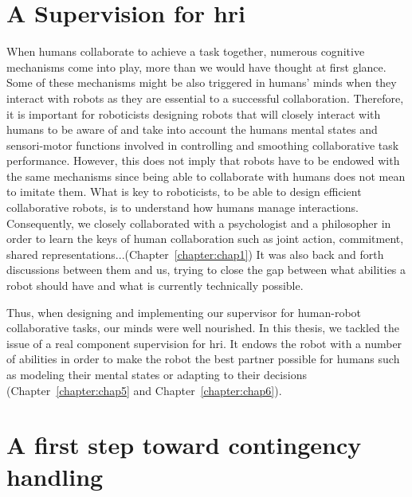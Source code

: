 \documentclass[a4paper,11pt,twoside]{StyleThese}
\begin{document}
\section*{A Supervision for \acrlong{hri}}
When humans collaborate to achieve a task together, numerous cognitive mechanisms come into play, more than we would have thought at first glance. Some of these mechanisms might be also triggered in humans’ minds when they interact with robots as they are essential to a successful collaboration. Therefore, it is important for roboticists designing robots that will closely interact with humans to be aware of and take into account the humans mental states and sensori-motor functions involved in controlling and smoothing collaborative task performance. However, this does not imply that robots have to be endowed with the same mechanisms since being able to collaborate with humans does not mean to imitate them. What is key to roboticists, to be able to design efficient collaborative robots, is to understand how humans manage interactions. Consequently, we closely collaborated with a psychologist and a philosopher in order to learn the keys of human collaboration such as joint action, commitment, shared representations...(Chapter~\ref{chapter:chap1}) It was also back and forth discussions between them and us, trying to close the gap between what abilities a robot should have and what is currently technically possible.

Thus, when designing and implementing our supervisor for human-robot collaborative tasks, our minds were well nourished. In this thesis, we tackled the issue of a real component supervision for \acrshort{hri}. It endows the robot with a number of abilities in order to make the robot the best partner possible for humans such as modeling their mental states or adapting to their decisions (Chapter~\ref{chapter:chap5} and Chapter~\ref{chapter:chap6}).

\section*{A first step toward contingency handling}
\end{document}
